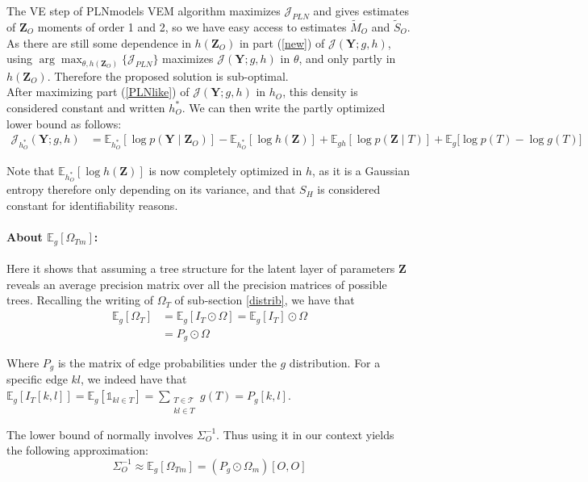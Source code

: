 \documentclass[11pt,a4paper]{article}
\newcommand{\argmax}{\arg\!\max}
\newcommand{\Ybf}{\boldsymbol{Y}}
\newcommand{\Zbf}{\boldsymbol{Z}}
\newcommand{\Esp}{\mathds{E}}
\begin{document}
The VE step of PLNmodels VEM algorithm maximizes $\mathcal{J}_{PLN}$ and gives estimates of $\Zbf_O$ moments of order 1 and 2, so we have easy access to estimates $\widetilde{M}_O$ and $\widetilde{S}_O$. As there are still some dependence in $h(\Zbf_O)$ in part (\ref{new}) of $\mathcal{J}(\Ybf; g,h)$, using $\argmax_{\theta, h(\Zbf_O)} \big\{ \mathcal{J}_{PLN} \big\}$ maximizes  $\mathcal{J}(\Ybf;g,h)$ in $\theta$, and only partly in $h(\Zbf_O)$. Therefore   the proposed solution is sub-optimal. \\

After maximizing part (\ref{PLNlike}) of $\mathcal{J}(\Ybf; g,h)$ in $h_O$, this density is considered constant and written $h_O^*$.  We can then write the partly optimized  lower bound as follows:
\begin{align*}
\mathcal{J}_{h_O^*}(\Ybf; g,h)&= \Esp_{h_O^*}[\log p(\Ybf \mid \Zbf_O)] - \Esp_{h_O^*}[\log h(\Zbf)] + \Esp_{gh}[\log p(\Zbf \mid T)] + \Esp_g \big[\log p(T) - \log g(T) \big]
\end{align*}

 Note that $\Esp_{h_O^*}[\log h(\Zbf)]$ is now completely optimized in $h$, as it is a Gaussian entropy therefore only depending on its variance, and that $S_H$ is considered constant for identifiability reasons.

\paragraph{About $\Esp_g [\Omega_{Tm}]$:}
Here it shows that assuming a tree structure for the latent layer of parameters $\Zbf$ reveals an average precision matrix over all the precision matrices of possible trees.  Recalling the writing of $\Omega_T$ of sub-section \ref{distrib}, we have that
 \begin{align*}
 \Esp_g [\Omega_{T}] & = \Esp_g [I_T \odot \Omega ] = \Esp_g [I_T] \odot \Omega \\
 &= P_g\odot \Omega
 \end{align*}

Where $P_g$ is the matrix of edge probabilities under the $g$ distribution. For a specific edge $kl$, we indeed have that $\Esp_g [I_T[k,l]] = \Esp_g [\mathds{1}_{kl \in T}] =  \sum_{\substack{T\in \mathcal{T}\\ kl \in T } }g(T) = P_g[k,l]$.

The lower bound of \cite{CMR18} normally involves $\Sigma_O^{-1}$. Thus using it in our context yields the following approximation:
$$\Sigma_O^{-1} \approx \Esp_g[\Omega_{Tm}] = (P_g \odot \Omega_m)[O,O] $$
\end{document}
